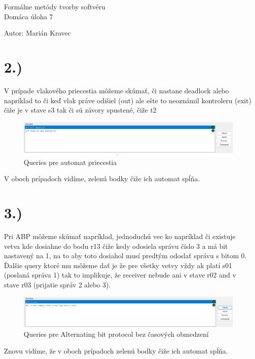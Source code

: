 \documentclass[a4paper]{article}
\begin{document}
 
	
\pagestyle{plain}

\begin{center}
	\sc\large
	Formálne metódy tvorby softvéru\\
	Domáca úloha 7
\end{center}

Autor: Marián Kravec


\section{2.)}

V prípade vlakového priecestia môžeme skúmať, či nastane deadlock alebo napríklad to či keď vlak práve odišiel (out) ale ešte to neoznámil kontroleru (exit) čiže je v stave s3 tak či sú závory spustené, čiže t2

\begin{figure}[!h]
	\centering
	\includegraphics[width=1.1\textwidth]{priecestie_query.png}
	\caption{Queries pre automat priecestia}
\end{figure}

V oboch prípadoch vidíme, zelenú bodky čiže ich automat spĺňa.

\section{3.)}

Pri ABP môžeme skúmať napríklad, jednoduchú vec ko napríklad či existuje vetva kde dosiahne do bodu r13 čiže kedy odosiela správu číslo 3 a má bit nastavený na 1, na to aby toto dosiahol musí predtým odoslať správu s bitom 0. Ďalšie query ktoré mu môžeme dať je že pre všetky vetvy vždy ak platí s01 (poslaná správa 1) tak to implikuje, že receiver nebude ani v stave r02 and v stave r03 (prijatie správ 2 alebo 3). 

\begin{figure}[!h]
	\centering
	\includegraphics[width=1.1\textwidth]{ABP_query.png}
	\caption{Queries pre Alternating bit protocol bez časových
		obmedzení}
\end{figure}

Znovu vidíme, že v oboch prípadoch zelenú bodky čiže ich automat spĺňa.
\end{document}
